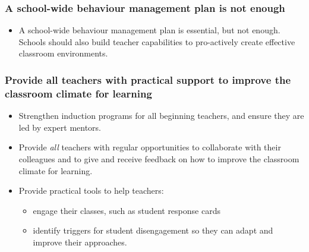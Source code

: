 \documentclass[FrontPage]{grattan}
\begin{document}
\begin{recommendations}\label{chap:recommendations}\raggedright%
\label{sec:recommendation-1-school-level}
\subsubsection{A school-wide behaviour management plan is not enough}\label{subsubsec:school-wide-behaviour-management-plan}

\begin{itemize}
    \item A school-wide behaviour management plan is essential, but not enough. Schools should also build teacher capabilities to pro-actively create effective classroom environments.
\end{itemize}

\subsubsection{Provide all teachers with practical support to improve the classroom climate for learning}\label{subsubsec:provide-all-teachers-practical-support}

\begin{itemize}
    \item Strengthen induction programs for all beginning teachers, and ensure they are led by expert mentors. 
    \item Provide \emph{all} teachers with regular opportunities to collaborate with their colleagues and to give and receive feedback on how to improve the classroom climate for learning.
    \item Provide practical tools to help teachers:
    \begin{itemize}
        \item engage their classes, such as student response cards
        \item identify triggers for student disengagement so they can adapt and improve their approaches.
    \end{itemize}
\end{itemize}



\end{recommendations}
\end{document}
